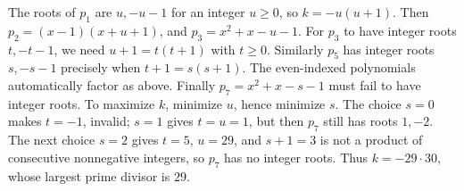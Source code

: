 The roots of $p_1$ are $u,-u-1$ for an integer $u\ge0$, so $k=-u(u+1)$. Then $p_2=(x-1)(x+u+1)$, and $p_3=x^2+x-u-1$. For $p_3$ to have integer roots $t,-t-1$, we need $u+1=t(t+1)$ with $t\ge0$. Similarly $p_5$ has integer roots $s,-s-1$ precisely when $t+1=s(s+1)$. The even-indexed polynomials automatically factor as above. Finally $p_7=x^2+x-s-1$ must fail to have integer roots. To maximize $k$, minimize $u$, hence minimize $s$. The choice $s=0$ makes $t=-1$, invalid; $s=1$ gives $t=u=1$, but then $p_7$ still has roots $1,-2$. The next choice $s=2$ gives $t=5$, $u=29$, and $s+1=3$ is not a product of consecutive nonnegative integers, so $p_7$ has no integer roots. Thus $k=-29\cdot30$, whose largest prime divisor is $\boxed{29}$.
